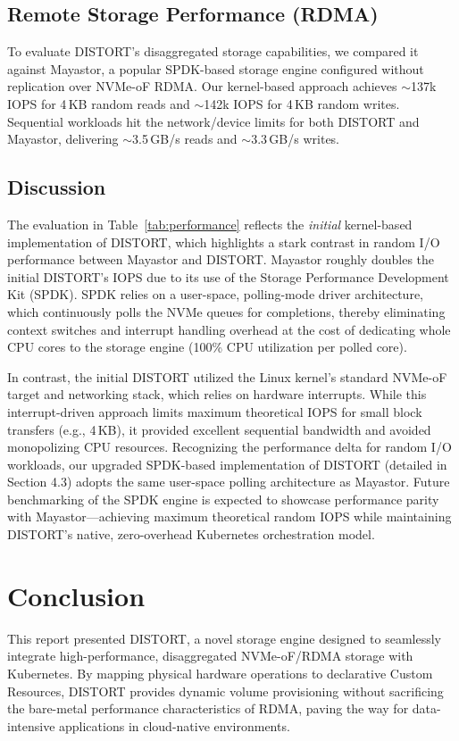 \documentclass[sigconf]{acmart}
\begin{document}
\subsection{Remote Storage Performance (RDMA)}
To evaluate DISTORT's disaggregated storage capabilities, we compared it against Mayastor, a popular SPDK-based storage engine configured without replication over NVMe-oF RDMA. Our kernel-based approach achieves $\sim$137k IOPS for 4\,KB random reads and $\sim$142k IOPS for 4\,KB random writes. Sequential workloads hit the network/device limits for both DISTORT and Mayastor, delivering $\sim$3.5\,GB/s reads and $\sim$3.3\,GB/s writes.

\subsection{Discussion}
The evaluation in Table~\ref{tab:performance} reflects the \textit{initial} kernel-based implementation of DISTORT, which highlights a stark contrast in random I/O performance between Mayastor and DISTORT. Mayastor roughly doubles the initial DISTORT's IOPS due to its use of the Storage Performance Development Kit (SPDK). SPDK relies on a user-space, polling-mode driver architecture, which continuously polls the NVMe queues for completions, thereby eliminating context switches and interrupt handling overhead at the cost of dedicating whole CPU cores to the storage engine (100\% CPU utilization per polled core).

In contrast, the initial DISTORT utilized the Linux kernel's standard NVMe-oF target and networking stack, which relies on hardware interrupts. While this interrupt-driven approach limits maximum theoretical IOPS for small block transfers (e.g., 4\,KB), it provided excellent sequential bandwidth and avoided monopolizing CPU resources. Recognizing the performance delta for random I/O workloads, our upgraded SPDK-based implementation of DISTORT (detailed in Section 4.3) adopts the same user-space polling architecture as Mayastor. Future benchmarking of the SPDK engine is expected to showcase performance parity with Mayastor—achieving maximum theoretical random IOPS while maintaining DISTORT's native, zero-overhead Kubernetes orchestration model.

\section{Conclusion}
This report presented DISTORT, a novel storage engine designed to seamlessly integrate high-performance, disaggregated NVMe-oF/RDMA storage with Kubernetes. By mapping physical hardware operations to declarative Custom Resources, DISTORT provides dynamic volume provisioning without sacrificing the bare-metal performance characteristics of RDMA, paving the way for data-intensive applications in cloud-native environments.



\end{document}

